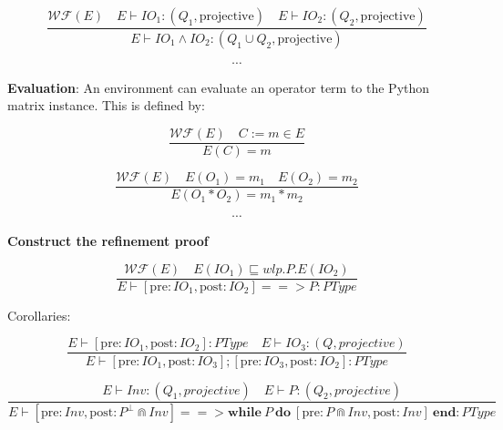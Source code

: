 \documentclass{article}
\begin{document}
$$
\frac{\mathcal{WF}(E)\quad E \vdash IO_1 : (Q_1, \text{projective}) \quad E \vdash IO_2 : (Q_2, \text{projective})}{E \vdash IO_1 \wedge IO_2 : (Q_1 \cup Q_2, \text{projective})}
$$

$$
\cdots
$$

\textbf{Evaluation}: An environment can evaluate an operator term to the Python matrix instance. This is defined by:

$$
\frac{\mathcal{WF}(E)\quad C:=m \in E}{E(C) = m}
$$

$$
\frac{\mathcal{WF}(E)\quad E(O_1) = m_1\quad E(O_2) = m_2 }{E(O_1 * O_2) = m_1 * m_2}
$$

$$
\cdots
$$

\textbf{Construct the refinement proof}

$$
\frac{\mathcal{WF}(E)\quad E(IO_1) \sqsubseteq wlp.P.E(IO_2)}{E \vdash [\mathrm{pre} : IO_1, \mathrm{post} : IO_2] ==> P : PType}
$$

Corollaries:

$$
\frac{E \vdash [\mathrm{pre} : IO_1, \mathrm{post} : IO_2]:PType \quad E \vdash IO_3 : (Q, projective)}{E \vdash [\mathrm{pre} : IO_1, \mathrm{post} : IO_3]; [\mathrm{pre} : IO_3, \mathrm{post} : IO_2] : PType}
$$

$$
\frac{E \vdash Inv : (Q_1, projective) \quad E \vdash P : (Q_2, projective)}{E \vdash [\mathrm{pre} : Inv, \mathrm{post} : P^\perp \Cap Inv]==> \mathbf{while}\ P\ \mathbf{do}\ [\mathrm{pre} : P \Cap Inv, \mathrm{post} : Inv]\ \mathbf{end} : PType }
$$
\end{document}
